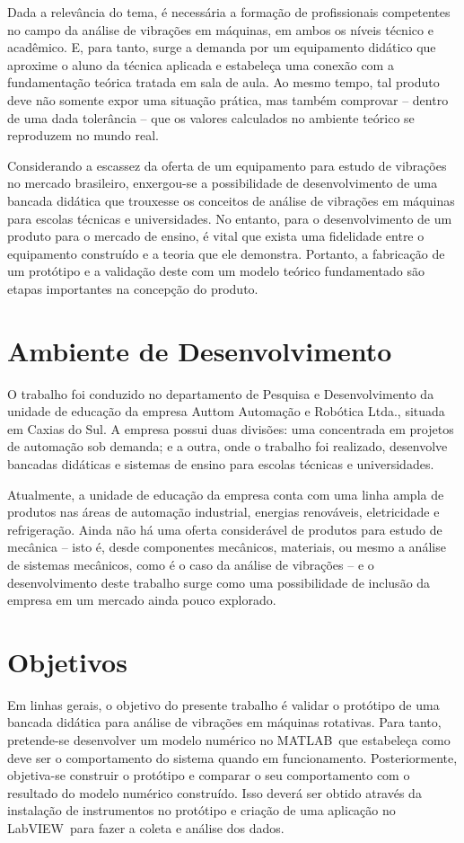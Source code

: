 \documentclass[12pt,openright,twoside,a4paper,
	chapter=TITLE,section=TITLE,
	english,brazil]{abntex2}
\begin{document}
	Dada a relevância do tema, é necessária a formação de profissionais competentes no campo da análise de vibrações em máquinas, em ambos os níveis técnico e acadêmico. E, para tanto, surge a demanda por um equipamento didático que aproxime o aluno da técnica aplicada e estabeleça uma conexão com a fundamentação teórica tratada em sala de aula. Ao mesmo tempo, tal produto deve não somente expor uma situação prática, mas também comprovar -- dentro de uma dada tolerância -- que os valores calculados no ambiente teórico se reproduzem no mundo real.
	
	Considerando a escassez da oferta de um equipamento para estudo de vibrações no mercado brasileiro, enxergou-se a possibilidade de desenvolvimento de uma bancada didática que trouxesse os conceitos de análise de vibrações em máquinas para escolas técnicas e universidades. No entanto, para o desenvolvimento de um produto para o mercado de ensino, é vital que exista uma fidelidade entre o equipamento construído e a teoria que ele demonstra. Portanto, a fabricação de um protótipo e a validação deste com um modelo teórico fundamentado são etapas importantes na concepção do produto.
	
	\section{Ambiente de Desenvolvimento}	
	O trabalho foi conduzido no departamento de Pesquisa e Desenvolvimento da unidade de educação da empresa Auttom Automação e Robótica Ltda., situada em Caxias do Sul. A empresa possui duas divisões: uma concentrada em projetos de automação sob demanda; e a outra, onde o trabalho foi realizado, desenvolve bancadas didáticas e sistemas de ensino para escolas técnicas e universidades.
	
	Atualmente, a unidade de educação da empresa conta com uma linha ampla de produtos nas áreas de automação industrial, energias renováveis, eletricidade e refrigeração. Ainda não há uma oferta considerável de produtos para estudo de mecânica -- isto é, desde componentes mecânicos, materiais, ou mesmo a análise de sistemas mecânicos, como é o caso da análise de vibrações -- e o desenvolvimento deste trabalho surge como uma possibilidade de inclusão da empresa em um mercado ainda pouco explorado.
	
	\section{Objetivos}
	Em linhas gerais, o objetivo do presente trabalho é validar o protótipo de uma bancada didática para análise de vibrações em máquinas rotativas. Para tanto, pretende-se desenvolver um modelo numérico no MATLAB\textsuperscript\textregistered\ que estabeleça como deve ser o comportamento do sistema quando em funcionamento. Posteriormente, objetiva-se construir o protótipo e comparar o seu comportamento com o resultado do modelo numérico construído. Isso deverá ser obtido através da instalação de instrumentos no protótipo e criação de uma aplicação no LabVIEW\textsuperscript\textregistered\ para fazer a coleta e análise dos dados.
	
\end{document}
